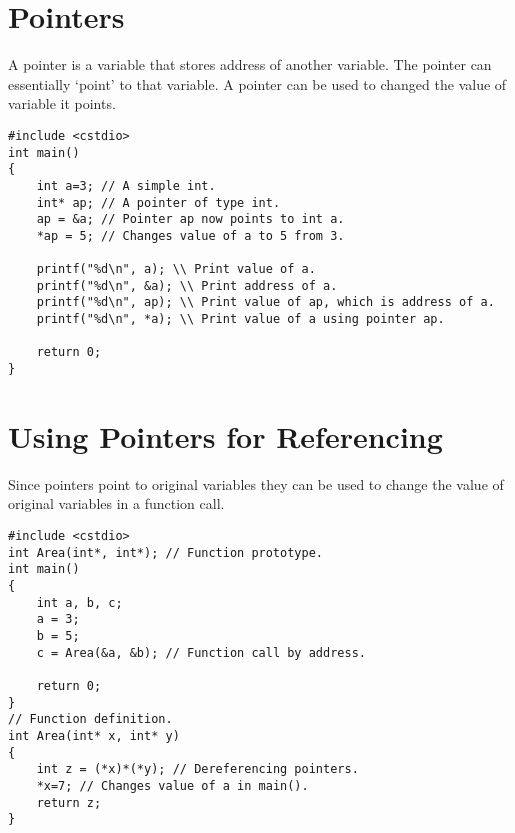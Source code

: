 \documentclass{article}
\begin{document}
\section{Pointers}
A pointer is a variable that stores address of another variable. The pointer can essentially `point' to that variable. A pointer can be used to changed the value of variable it points.
\begin{lstlisting}[caption={Pointers}]
#include <cstdio>
int main()
{
	int a=3; // A simple int.
	int* ap; // A pointer of type int.
	ap = &a; // Pointer ap now points to int a.
	*ap = 5; // Changes value of a to 5 from 3.

	printf("%d\n", a); \\ Print value of a.
	printf("%d\n", &a); \\ Print address of a.
	printf("%d\n", ap); \\ Print value of ap, which is address of a.
	printf("%d\n", *a); \\ Print value of a using pointer ap.

	return 0;
}
\end{lstlisting}
\section{Using Pointers for Referencing}
Since pointers point to original variables they can be used to change the value of original variables in a function call.
\begin{lstlisting}[caption={Pointers as Arguments}]
#include <cstdio>
int Area(int*, int*); // Function prototype.
int main()
{
	int a, b, c;
	a = 3;
	b = 5;
	c = Area(&a, &b); // Function call by address.
	
	return 0;
}
// Function definition.
int Area(int* x, int* y)
{
	int z = (*x)*(*y); // Dereferencing pointers.
	*x=7; // Changes value of a in main().
	return z;
}
\end{lstlisting}
\end{document}
